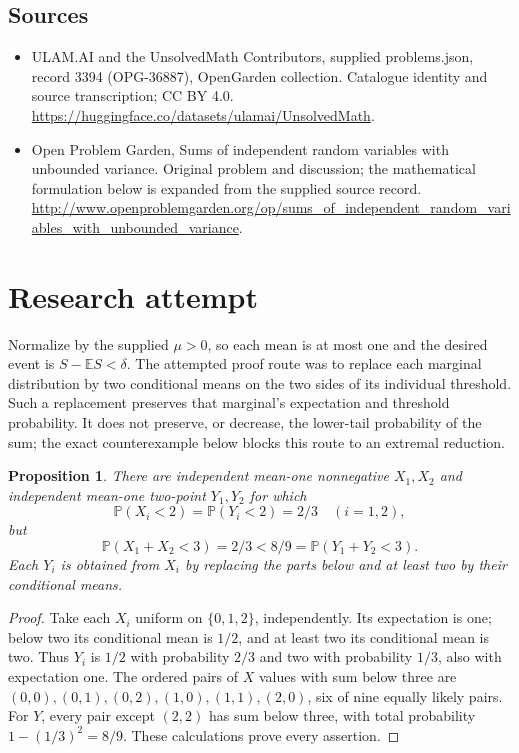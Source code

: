 \documentclass[11pt,a4paper]{article}
\newtheorem{proposition}{Proposition}
\begin{document}
\subsection{Sources}
\begin{itemize}
\item[S1] ULAM.AI and the UnsolvedMath Contributors, supplied problems.json, record 3394 (OPG-36887), OpenGarden collection. Catalogue identity and source transcription; CC BY 4.0.
\url{https://huggingface.co/datasets/ulamai/UnsolvedMath}.
\item[S2] Open Problem Garden, Sums of independent random variables with unbounded variance. Original problem and discussion; the mathematical formulation below is expanded from the supplied source record.
\url{http://www.openproblemgarden.org/op/sums_of_independent_random_variables_with_unbounded_variance}.
\end{itemize}


\section{Research attempt}
Normalize by the supplied $\mu>0$, so each mean is at most one and the desired event is $S-\mathbb ES<\delta$. The attempted proof route was to replace each marginal distribution by two conditional means on the two sides of its individual threshold. Such a replacement preserves that marginal's expectation and threshold probability. It does not preserve, or decrease, the lower-tail probability of the sum; the exact counterexample below blocks this route to an extremal reduction.

\begin{proposition}
There are independent mean-one nonnegative $X_1,X_2$ and independent mean-one two-point $Y_1,Y_2$ for which
\[
 \mathbb P(X_i<2)=\mathbb P(Y_i<2)=2/3\quad(i=1,2),
\]
but
\[
 \mathbb P(X_1+X_2<3)=2/3<8/9=
 \mathbb P(Y_1+Y_2<3).
\]
Each $Y_i$ is obtained from $X_i$ by replacing the parts below and at least two by their conditional means.
\end{proposition}
\begin{proof}
Take each $X_i$ uniform on $\{0,1,2\}$, independently. Its expectation is one; below two its conditional mean is $1/2$, and at least two its conditional mean is two. Thus $Y_i$ is $1/2$ with probability $2/3$ and two with probability $1/3$, also with expectation one. The ordered pairs of $X$ values with sum below three are $(0,0),(0,1),(0,2),(1,0),(1,1),(2,0)$, six of nine equally likely pairs. For $Y$, every pair except $(2,2)$ has sum below three, with total probability $1-(1/3)^2=8/9$. These calculations prove every assertion.
\end{proof}
\end{document}
